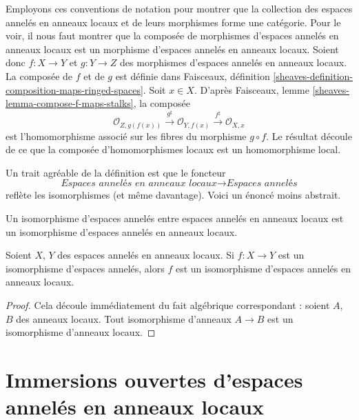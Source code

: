 \medskip\noindent
Employons ces conventions de notation pour montrer que la
collection des espaces annelés en anneaux locaux et de leurs morphismes
forme une catégorie. Pour le voir, il nous faut
montrer que la composée de morphismes d'espaces annelés en anneaux locaux
est un morphisme d'espaces annelés en anneaux locaux. Soient donc
$f : X \to Y$ et $g : Y \to Z$ des morphismes d'espaces annelés en anneaux
locaux. La composée de $f$ et de $g$ est définie dans
Faisceaux, définition \ref{sheaves-definition-composition-maps-ringed-spaces}.
Soit $x \in X$. D'après
Faisceaux, lemme \ref{sheaves-lemma-compose-f-maps-stalks},
la composée
$$
\mathcal{O}_{Z, g(f(x))}
\xrightarrow{g^\sharp}
\mathcal{O}_{Y, f(x)}
\xrightarrow{f^\sharp}
\mathcal{O}_{X, x}
$$
est l'homomorphisme associé sur les fibres du morphisme $g \circ f$.
Le résultat découle de ce que la composée d'homomorphismes locaux
est un homomorphisme local.

\medskip\noindent
Un trait agréable de la définition est que le foncteur
$$
\textit{Espaces annelés en anneaux locaux}
\longrightarrow
\textit{Espaces annelés}
$$
reflète les isomorphismes (et même davantage).
Voici un énoncé moins abstrait.

\begin{lemma}
\label{lemma-isomorphism-locally-ringed}
\begin{slogan}
Un isomorphisme d'espaces annelés entre espaces annelés en anneaux locaux est un
isomorphisme d'espaces annelés en anneaux locaux.
\end{slogan}
Soient $X$, $Y$ des espaces annelés en anneaux locaux.
Si $f : X \to Y$ est un isomorphisme d'espaces annelés,
alors $f$ est un isomorphisme
d'espaces annelés en anneaux locaux.
\end{lemma}

\begin{proof}
Cela découle immédiatement du fait algébrique correspondant :
soient $A$, $B$ des anneaux locaux. Tout isomorphisme d'anneaux
$A \to B$ est un isomorphisme d'anneaux locaux.
\end{proof}













\section{Immersions ouvertes d'espaces annelés en anneaux locaux}
\label{section-open-immersion}

